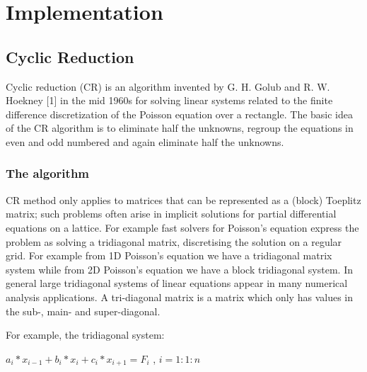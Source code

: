 \chapter{Implementation}

\section{Cyclic Reduction}


Cyclic reduction (CR) is an algorithm invented by G. H. Golub and R. W. Hoekney [1] in the mid 1960s for solving linear systems related to the finite difference discretization of the Poisson equation over a rectangle. 
The basic idea of the CR algorithm is to eliminate half the unknowns, regroup the equations in even and odd numbered and again eliminate half the unknowns.


\subsection{The algorithm}

CR method only applies to matrices that can be represented as a (block) Toeplitz matrix; such problems often arise in implicit solutions for partial differential equations on a lattice. For example fast solvers for Poisson's equation express the problem as solving a tridiagonal matrix, discretising the solution on a regular grid. For example from 1D Poisson’s equation we have a tridiagonal matrix system while from 2D Poisson’s equation we have a block tridiagonal system.
In general large tridiagonal systems of linear equations appear in many numerical analysis applications. A tri-diagonal matrix is a matrix which only has values in the sub-, main- and super-diagonal.

For example, the tridiagonal system:

$a_i*x_{i-1} + b_i*x_i+c_i*x_{i+1} = F_{i}$  , \hspace*{2cm} $ i=1:1:n$

